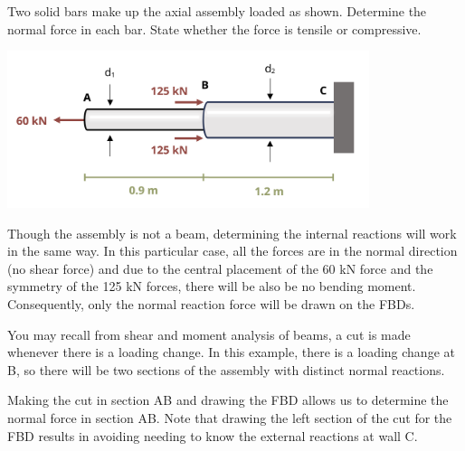\documentclass[
  letterpaper,
  DIV=11,
  numbers=noendperiod]{scrreprt}
\begin{document}
\begin{tcolorbox}[enhanced jigsaw, breakable, opacityback=0, toptitle=1mm, left=2mm, colback=white, opacitybacktitle=0.6, colframe=quarto-callout-tip-color-frame, titlerule=0mm, arc=.35mm, leftrule=.75mm, bottomtitle=1mm, colbacktitle=quarto-callout-tip-color!10!white, rightrule=.15mm, title={Example 1.5}, bottomrule=.15mm, toprule=.15mm, coltitle=black]

Two solid bars make up the axial assembly loaded as shown. Determine the
normal force in each bar. State whether the force is tensile or
compressive.

\begin{center}
\includegraphics[width=4.16667in,height=\textheight]{images/CH1 PNGs/example 1.5 part 1.png}
\end{center}

\begin{tcolorbox}[enhanced jigsaw, breakable, opacityback=0, toptitle=1mm, left=2mm, colback=white, opacitybacktitle=0.6, colframe=quarto-callout-tip-color-frame, titlerule=0mm, arc=.35mm, leftrule=.75mm, bottomtitle=1mm, colbacktitle=quarto-callout-tip-color!10!white, rightrule=.15mm, title={Solution}, bottomrule=.15mm, toprule=.15mm, coltitle=black]

Though the assembly is not a beam, determining the internal reactions
will work in the same way. In this particular case, all the forces are
in the normal direction (no shear force) and due to the central
placement of the 60 kN force and the symmetry of the 125 kN forces,
there will be also be no bending moment. Consequently, only the normal
reaction force will be drawn on the FBDs.

You may recall from shear and moment analysis of beams, a cut is made
whenever there is a loading change. In this example, there is a loading
change at B, so there will be two sections of the assembly with distinct
normal reactions.

Making the cut in section AB and drawing the FBD allows us to determine
the normal force in section AB. Note that drawing the left section of
the cut for the FBD results in avoiding needing to know the external
reactions at wall C.


\end{tcolorbox}
\end{tcolorbox}
\end{document}
